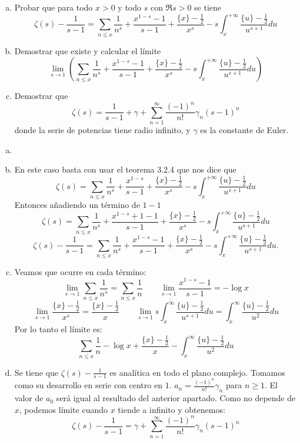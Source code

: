 \documentclass[twoside]{article}
\begin{document}
\newpage
\begin{ejercicio}{2}
\begin{enumerate}[(a)]
	\item Probar que para todo $x > 0$ y todo $s$ con $\Re s > 0$ se tiene
	\[ ζ(s) - \frac{1}{s-1} = \sum_{n≤x} \frac{1}{n^s} + \frac{x^{1-s}-1}{s-1} + \frac{\{x\}-\frac{1}{2}}{x^s} - s \int_x^{+∞} \frac{\{u\}-\frac{1}{2}}{u^{s+1}} du \]
	\item Demostrar que existe y calcular el límite
	\[ \lim_{s \to 1} \left(\sum_{n≤x} \frac{1}{n^s} + \frac{x^{1-s}-1}{s-1} + \frac{\{x\}-\frac{1}{2}}{x^s} - s \int_x^{+∞} \frac{\{u\}-\frac{1}{2}}{u^{s+1}} du\right) \]
	\item Demostrar que
	\[ ζ(s) = \frac{1}{s-1} + γ + \sum_{n=1}^{∞} \frac{(-1)^n}{n!} γ_n (s-1)^n \]
	donde la serie de potencias tiene radio infinito, y $γ$ es la constante de Euler.
\end{enumerate}
\end{ejercicio}
\begin{solucion}
\begin{enumerate}[(a)]
\item[]
\item En este caso basta con usar el teorema 3.2.4 que nos dice que 
$$\zeta(s)=\sum\limits_{n\leq x}\dfrac{1}{n^s}+\dfrac{x^{1-s}}{s-1}+\dfrac{\{x\}-\frac{1}{2}}{x^s}-s\int_x^{+\infty}\frac{\{u\}-\frac{1}{2}}{u^{s+1}}du$$
Entonces añadiendo un término de $1-1$
$$\zeta(s)=\sum\limits_{n\leq x}\dfrac{1}{n^s}+\dfrac{x^{1-s}+1-1}{s-1}+\dfrac{\{x\}-\frac{1}{2}}{x^s}-s\int_x^{+\infty}\frac{\{u\}-\frac{1}{2}}{u^{s+1}}du$$
$$\displaystyle{\zeta(s)-\frac{1}{s-1}=\sum\limits_{n\leq x}\frac{1}{n^s}+\frac{x^{1-s}-1}{s-1}+\frac{\{x\}-\frac{1}{2}}{x^s}-s\int_x^{+\infty}\frac{\{u\}-\frac{1}{2}}{u^{s+1}}du}.$$
	\item Veamos que ocurre en cada término:
	\[ \lim_{s \to 1} \sum_{n≤x} \frac{1}{n^s} = \sum_{n≤x} \frac{1}{n} 
	\qquad \lim_{s \to 1} \frac{x^{1-s}-1}{s-1} = - \log x \]
	\[ \lim_{s \to 1} \frac{\{x\}-\frac{1}{2}}{x^s} = \frac{\{x\}-\frac{1}{2}}{x} \qquad \lim_{s \to 1} s \int_x^{∞} \frac{\{u\}-\frac{1}{2}}{u^{s+1}} du = \int_x^{∞} \frac{\{u\}-\frac{1}{2}}{u^2} du \]
	Por lo tanto el límite es:
	\[ \sum_{n≤x}\frac{1}{n} - \log x + \frac{\{x\}-\frac{1}{2}}{x} - \int_x^{∞} \frac{\{u\}-\frac{1}{2}}{u^2} du \]
	\item Se tiene que $ζ(s)-\frac{1}{s-1}$ es analítica en todo el plano complejo. Tomamos como su desarrollo en serie con centro en $1$. $a_n=\frac{(-1)^n}{n!} γ_n$ para $n ≥ 1$. El valor de $a_0$ será igual al resultado del anterior apartado. Como no depende de $x$, podemos límite cuando $x$ tiende a infinito y obtenemos:
	\[ ζ(s) - \frac{1}{s-1} = γ + \sum_{n=1}^{∞} \frac{(-1)^n}{n!} γ_n (s-1)^n \]
\end{enumerate}
\end{solucion}
\newpage
\end{document}
